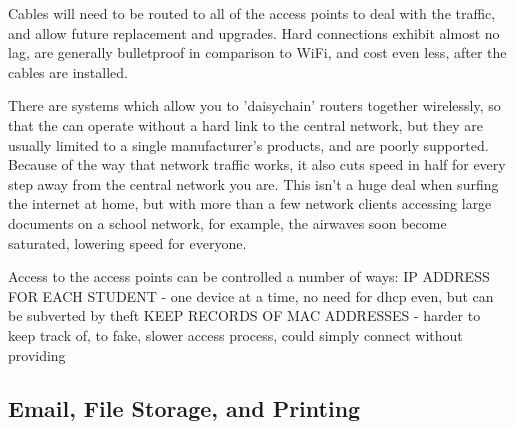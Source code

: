 \documentclass[a4paper,leqno,titlepage]{article}
\begin{document}
Cables will need to be routed to all of the access points to deal with the
traffic, and allow future replacement and upgrades. Hard connections exhibit
almost no lag, are generally bulletproof in comparison to WiFi, and cost even
less, after the cables are installed.

There are systems which allow you to 'daisychain' routers together wirelessly,
so that the can operate without a hard link to the central network, but they are
usually limited to a single manufacturer's products, and are poorly supported.
Because of the way that network traffic works, it also cuts speed in half for
every step away from the central network you are. This isn't a huge deal when
surfing the internet at home, but with more than a few network clients accessing
large documents on a school network, for example, the airwaves soon become
saturated, lowering speed for everyone.


Access to the access points can be controlled a number of ways:
IP ADDRESS FOR EACH STUDENT - one device at a time, no need for dhcp even, but can be subverted by theft
KEEP RECORDS OF MAC ADDRESSES - harder to keep track of, to fake, slower access process, could simply connect without providing




\subsection{Email, File Storage, and Printing}


\end{document}
